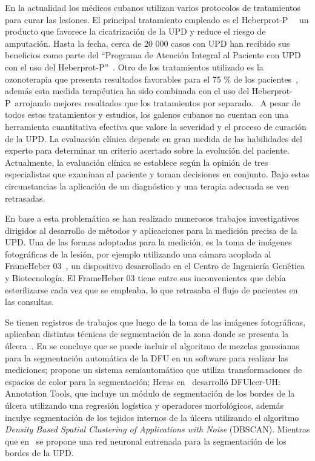 En la actualidad los médicos cubanos utilizan varios protocolos de tratamientos para curar las lesiones. El principal tratamiento empleado es el Heberprot-P~\textregistered~\cite{berlanga2013heberprot} un producto que favorece la cicatrización de la UPD y reduce el riesgo de amputación. Hasta la fecha, cerca de 20 000 casos con UPD han recibido sus beneficios como parte del “Programa de Atención Integral al Paciente con UPD con el uso del Heberprot-P”~\cite{gonzalez2015resultados}. Otro de los tratamientos utilizado es la ozonoterapia que presenta resultados favorables para el 75 \% de los pacientes~\cite{alvarez2014beneficios}, además esta medida terapéutica ha sido combinada con el uso del Heberprot-P~\textregistered  arrojando mejores resultados que los tratamientos por separado.~\cite{martinez2019evolucion} A pesar de todos estos tratamientos y estudios, los galenos cubanos no cuentan con una herramienta cuantitativa efectiva que valore la severidad y el proceso de curación de la UPD. La evaluación clínica depende en gran medida de las habilidades del experto para determinar un criterio acertado sobre la evolución del paciente. Actualmente, la evaluación clínica se establece según la opinión de tres especialistas que examinan al paciente y toman decisiones en conjunto. Bajo estas circunstancias la aplicación de un diagnóstico y una terapia adecuada se ven retrasadas.

En base a esta problemática se han realizado numerosos trabajos investigativos dirigidos al desarrollo de métodos y aplicaciones para la medición precisa de la UPD. Una de las formas adoptadas para la medición, es la toma de imágenes fotográficas de la lesión, por ejemplo utilizando una cámara acoplada al FrameHeber 03~\cite{cabal2019quantitative}, un dispositivo desarrollado en el Centro de Ingeniería Genética y Biotecnología. El FrameHeber 03 tiene entre sus inconvenientes que debía esterilizarse cada vez que se empleaba, lo que retrasaba el flujo de pacientes en las consultas. 

Se tienen registros de trabajos que luego de la toma de las imágenes fotográficas, aplicaban distintas técnicas de segmentación de la zona donde se presenta la úlcera~\cite{garcia2019mejoramiento, pena2016segmentacion, heras2022diabetic, ching2022segm3d}. En \cite{garcia2019mejoramiento} se concluye que se puede incluir el algoritmo de mezclas gaussianas para la segmentación automática de la DFU en un software para realizar las mediciones; \cite{pena2016segmentacion} propone un sistema semiautomático que utiliza transformaciones de espacios de color para la segmentación; Heras en~\cite{heras2022diabetic} desarrolló DFUlcer-UH: Annotation Tools, que incluye un módulo de segmentación de los bordes de la úlcera utilizando una regresión logística y operadores morfológicos, además inculye segmentación de los tejidos internos de la úlcera utilizando el algoritmo \textit{Density Based Spatial Clustering of Applications with Noise} (DBSCAN). Mientras que en~\cite{ching2022segm3d} se propone una red neuronal entrenada para la segmentación de los bordes de la UPD.

